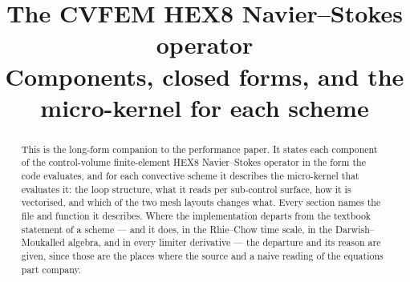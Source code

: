 \documentclass[11pt,a4paper]{article}
\title{The CVFEM HEX8 Navier--Stokes operator\\
       \large Components, closed forms, and the micro-kernel for each scheme}
\author{}
\date{}
\begin{document}
\maketitle

\begin{abstract}
\noindent
This is the long-form companion to the performance paper. It states each component of the
control-volume finite-element HEX8 Navier--Stokes operator in the form the code evaluates, and for
each convective scheme it describes the micro-kernel that evaluates it: the loop structure, what it
reads per sub-control surface, how it is vectorised, and which of the two mesh layouts changes what.
Every section names the file and function it describes. Where the implementation departs from the
textbook statement of a scheme --- and it does, in the Rhie--Chow time scale, in the
Darwish--Moukalled algebra, and in every limiter derivative --- the departure and its reason are
given, since those are the places where the source and a naive reading of the equations part
company.
\end{abstract}

\tableofcontents












\end{document}
